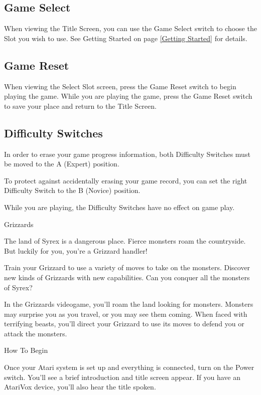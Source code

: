 \documentclass[10pt,twoside,openright]{memoir}
\begin{document}
\subsection{Game Select}

When viewing the Title Screen, you can use the Game Select switch to
choose the Slot you wish to use.  See Getting Started on page
\ref{Getting Started} for details.

\subsection{Game Reset}

When viewing  the Select  Slot screen,  press the  Game Reset  switch to
begin playing the  game. While you are playing the  game, press the Game
Reset switch to save your place and return to the Title Screen.

\subsection{Difficulty Switches}

In order to erase your game progress information, both Difficulty
Switches must be moved to the A (Expert) position.

To protect  against accidentally erasing  your game record, you  can set
the right Difficulty Switch to the B (Novice) position.

While  you  are playing,  the  Difficulty  Switches  have no  effect  on
game play. 



Grizzards

The land of Syrex is a dangerous place. Fierce monsters roam the countryside.
But luckily for you, you're a Grizzard handler!

Train your Grizzard to use a variety of moves to take on the monsters.
Discover new kinds of Grizzards with new capabilities. Can you conquer all
the monsters of Syrex?

In the Grizzards videogame, you'll roam the land looking for monsters.
Monsters may surprise you as you travel, or you may see them coming. When
faced with terrifying beasts, you'll direct your Grizzard to use its moves
to defend you or attack the monsters.



How To Begin

Once your Atari system is set up and everything is connected, turn on the
Power switch. You'll see a brief introduction and title screen appear. If
you have an AtariVox device, you'll also hear the title spoken.
\end{document}
